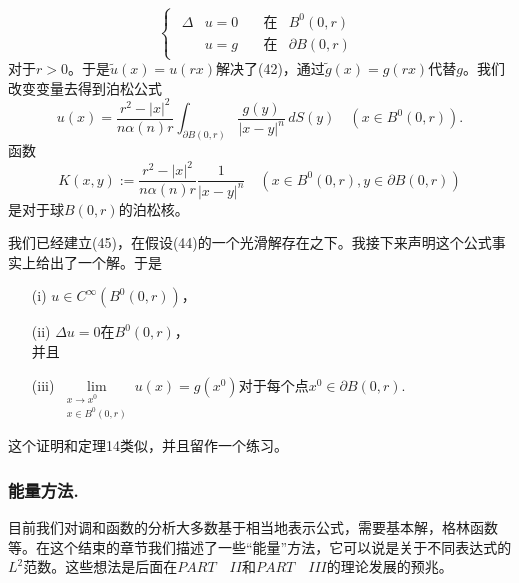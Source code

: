 \documentclass[leqno]{article}
\numberwithin{equation}{subsection}%
\begin{document}
\begin{equation}
\begin{cases}
\begin{aligned}
\Delta &u=0 \quad &\text{在}&B^{0}(0,r)\\
&u=g&\text{在}&\partial B(0,r)
\end{aligned}
\end{cases}
\end{equation}
对于$r>0$。于是$\tilde{u}(x)=u(rx)$解决了(42)，通过$\tilde{g}(x)=g(rx)$代替$g$。我们改变变量去得到泊松公式
\begin{equation}
u(x)=\frac{r^{2}-|x|^{2}}{n\alpha(n)r}\int_{\partial B(0,r)}\frac{g(y)}{|x-y|^{n}}\,dS(y)\quad(x\in B^{0}(0,r)).
\end{equation}
函数
\begin{equation*}
K(x,y):=\frac{r^{2}-|x|^{2}}{n\alpha(n)r}\frac{1}{|x-y|^{n}}\quad(x\in B^{0}(0,r),y\in\partial B(0,r))
\end{equation*}
是对于球$B(0,r)$的泊松核。
\par
我们已经建立(45)，在假设(44)的一个光滑解存在之下。我接下来声明这个公式事实上给出了一个解。于是
\begin{enumerate}[fullwidth,itemindent=2em]
	\item[(i)]$u\in C^{\infty}(B^{0}(0,r))$，
	\item[(ii)]$\Delta u=0$在$B^{0}(0,r)$，\\
	并且\vspace{-2ex}
	\item[(iii)]$\lim\limits_{\substack{x\rightarrow x^{0}\\x\in B^{0}(0,r)}} u(x)=g(x^{0})$对于每个点$x^{0}\in\partial B(0,r)$.
\end{enumerate}
这个证明和定理14类似，并且留作一个练习。

\subsubsection{能量方法.}
目前我们对调和函数的分析大多数基于相当地表示公式，需要基本解，格林函数等。在这个结束的章节我们描述了一些“能量”方法，它可以说是关于不同表达式的$L^{2}$范数。这些想法是后面在$PART\quad II$和$PART\quad III$的理论发展的预兆。
\end{document}
